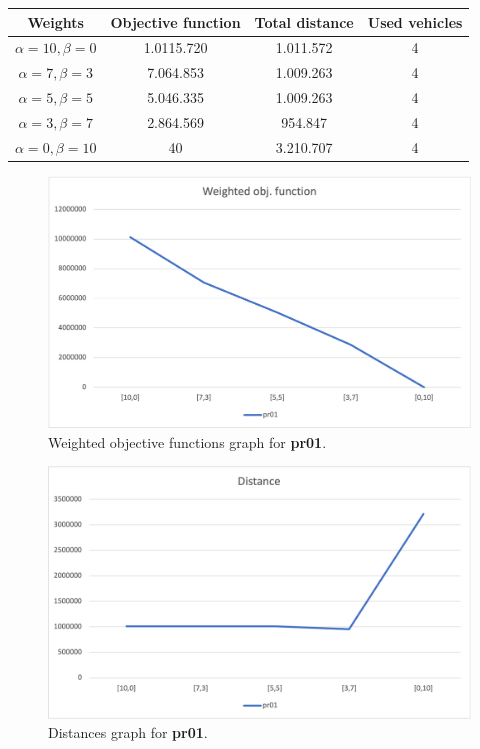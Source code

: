 {
\renewcommand{\arraystretch}{2}
\begin{longtable}[h]{| c | c | c | c |}
    \hline
    \textbf{Weights} & \textbf{Objective function} & \textbf{Total distance} & \textbf{Used vehicles} \\
    \hline
    \endhead
    $\alpha = 10, \beta = 0$ & 1.0115.720 & 1.011.572 & 4 \\
    \hline
    $\alpha = 7, \beta = 3$  &  7.064.853 & 1.009.263 & 4 \\
    \hline
    $\alpha = 5, \beta = 5$  &  5.046.335 & 1.009.263 & 4 \\
    \hline
    $\alpha = 3, \beta = 7$  &  2.864.569 &   954.847 & 4 \\
    \hline
    $\alpha = 0, \beta = 10$ &         40 & 3.210.707 & 4 \\
    \hline
\end{longtable}
}
\begin{figure}[H]
    \centering
    \includegraphics[height=0.25\textheight]{../graphs/pr01-wobjf.png}
    \caption{Weighted objective functions graph for \textbf{pr01}.}
\end{figure}

\begin{figure}[H]
    \centering
    \includegraphics[height=0.25\textheight]{../graphs/pr01-distance.png}
    \caption{Distances graph for \textbf{pr01}.}
\end{figure}

